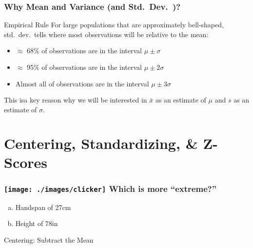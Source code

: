 %
\begin{frame}
\frametitle{Why Mean and Variance (and Std.\ Dev.\ )?}
\begin{alertblock}{Empirical Rule}
For large populations that are approximately bell-shaped, std.\ dev.\ tells where most observations will be relative to the mean:
	\begin{itemize}
		\item $\approx$ 68\% of observations are in the interval $\mu \pm \sigma$
		\item $\approx$ 95\% of observations are in the interval $\mu \pm 2\sigma$
		\item Almost all of observations are in the interval $\mu \pm 3\sigma$
	\end{itemize}
\end{alertblock}
\pause

\alert{This isa key reason why we will be interested in $\bar{x}$ as an estimate of $\mu$ and $s$ as an estimate of $\sigma$.}
\end{frame}
\section{Centering, Standardizing, \& Z-Scores}
\begin{frame}

\frametitle{\texttt{[image: ./images/clicker]} \hfill Which is more ``extreme?''}
	\begin{enumerate}[(a)]
		\item Handspan of 27cm
		\item Height of 78in
	\end{enumerate}

\end{frame}


\begin{frame}


\centering \huge Centering: Subtract the Mean
\normalsize

\vspace{3em}

\end{frame}

